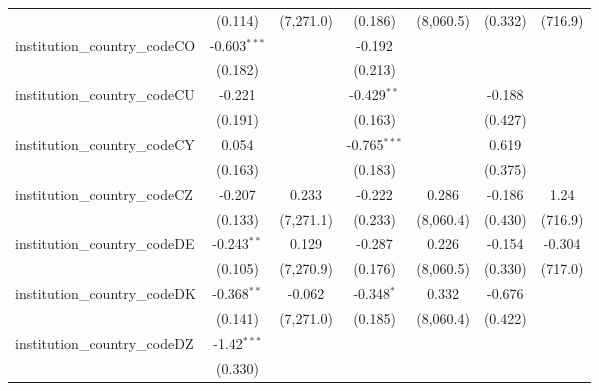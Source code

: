 \begin{tabular}{lcccccc}
                                         & (0.114)        & (7,271.0)     & (0.186)        & (8,060.5)      & (0.332)        & (716.9)\\   
   institution\_country\_codeCO          & -0.603$^{***}$ &               & -0.192         &                &                &   \\   
                                         & (0.182)        &               & (0.213)        &                &                &   \\   
   institution\_country\_codeCU          & -0.221         &               & -0.429$^{**}$  &                & -0.188         &   \\   
                                         & (0.191)        &               & (0.163)        &                & (0.427)        &   \\   
   institution\_country\_codeCY          & 0.054          &               & -0.765$^{***}$ &                & 0.619          &   \\   
                                         & (0.163)        &               & (0.183)        &                & (0.375)        &   \\   
   institution\_country\_codeCZ          & -0.207         & 0.233         & -0.222         & 0.286          & -0.186         & 1.24\\   
                                         & (0.133)        & (7,271.1)     & (0.233)        & (8,060.4)      & (0.430)        & (716.9)\\   
   institution\_country\_codeDE          & -0.243$^{**}$  & 0.129         & -0.287         & 0.226          & -0.154         & -0.304\\   
                                         & (0.105)        & (7,270.9)     & (0.176)        & (8,060.5)      & (0.330)        & (717.0)\\   
   institution\_country\_codeDK          & -0.368$^{**}$  & -0.062        & -0.348$^{*}$   & 0.332          & -0.676         &   \\   
                                         & (0.141)        & (7,271.0)     & (0.185)        & (8,060.4)      & (0.422)        &   \\   
   institution\_country\_codeDZ          & -1.42$^{***}$  &               &                &                &                &   \\   
                                         & (0.330)        &               &                &                &                &   \\   

\end{tabular}
